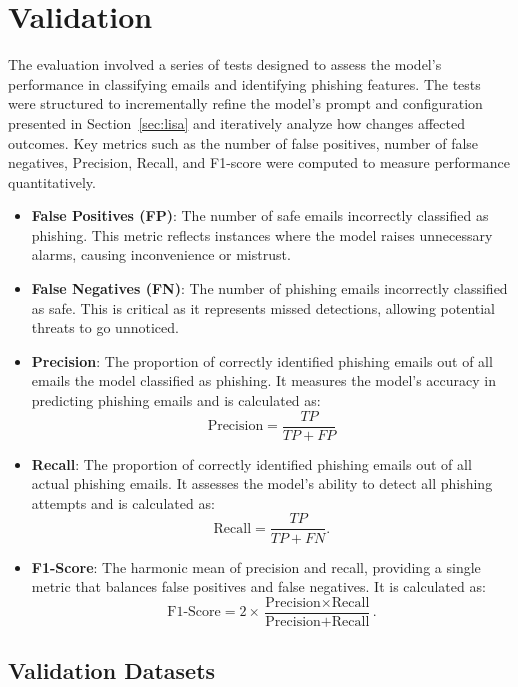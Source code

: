 \section{Validation}
\label{sec:validation}
The evaluation involved a series of tests designed to assess the model’s performance in classifying emails and identifying phishing features. The tests were structured to incrementally refine the model’s prompt and configuration presented in Section~\ref{sec:lisa} and iteratively analyze how changes affected outcomes. Key metrics such as the number of false positives, number of false negatives, Precision, Recall, and F1-score were computed to measure performance quantitatively.

\begin{itemize}
    \item \textbf{False Positives (FP)}: The number of safe emails incorrectly classified as phishing. This metric reflects instances where the model raises unnecessary alarms, causing inconvenience or mistrust.
    \item \textbf{False Negatives (FN)}: The number of phishing emails incorrectly classified as safe. This is critical as it represents missed detections, allowing potential threats to go unnoticed.
    \item \textbf{Precision}: The proportion of correctly identified phishing emails out of all emails the model classified as phishing. It measures the model's accuracy in predicting phishing emails and is calculated as: \[
    \text{Precision} = \frac{TP}{TP + FP}
    \]
    \item \textbf{Recall}: The proportion of correctly identified phishing emails out of all actual phishing emails. It assesses the model's ability to detect all phishing attempts and is calculated as:     \[
    \text{Recall} = \frac{TP}{TP + FN}.
    \]
    \item \textbf{F1-Score}: The harmonic mean of precision and recall, providing a single metric that balances false positives and false negatives. It is calculated as:     \[
    \text{F1-Score} = 2 \times \frac{\text{Precision} \times \text{Recall}}{\text{Precision} + \text{Recall}}.
    \]
\end{itemize}

\subsection{Validation Datasets}
\label{sec:valdataset}

